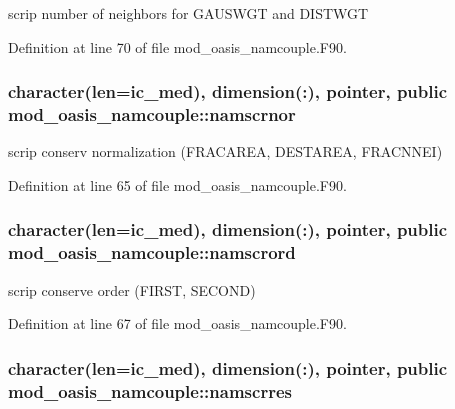 scrip number of neighbors for G\+A\+U\+S\+W\+G\+T and D\+I\+S\+T\+W\+G\+T 



Definition at line 70 of file mod\+\_\+oasis\+\_\+namcouple.\+F90.

\hypertarget{classmod__oasis__namcouple_a392f40531007d5dcc084e6ad4a393fd7}{
\subsubsection[{namscrnor}]{\setlength{\rightskip}{0pt plus 5cm}character(len=ic\+\_\+med), dimension(\+:), pointer, public mod\+\_\+oasis\+\_\+namcouple\+::namscrnor}}\label{classmod__oasis__namcouple_a392f40531007d5dcc084e6ad4a393fd7}


scrip conserv normalization (F\+R\+A\+C\+A\+R\+E\+A, D\+E\+S\+T\+A\+R\+E\+A, F\+R\+A\+C\+N\+N\+E\+I) 



Definition at line 65 of file mod\+\_\+oasis\+\_\+namcouple.\+F90.

\hypertarget{classmod__oasis__namcouple_ac881ced105604879ada860fabd677481}{
\subsubsection[{namscrord}]{\setlength{\rightskip}{0pt plus 5cm}character(len=ic\+\_\+med), dimension(\+:), pointer, public mod\+\_\+oasis\+\_\+namcouple\+::namscrord}}\label{classmod__oasis__namcouple_ac881ced105604879ada860fabd677481}


scrip conserve order (F\+I\+R\+S\+T, S\+E\+C\+O\+N\+D) 



Definition at line 67 of file mod\+\_\+oasis\+\_\+namcouple.\+F90.

\hypertarget{classmod__oasis__namcouple_a6a95ddbbbc615e0257d93d05e4546239}{
\subsubsection[{namscrres}]{\setlength{\rightskip}{0pt plus 5cm}character(len=ic\+\_\+med), dimension(\+:), pointer, public mod\+\_\+oasis\+\_\+namcouple\+::namscrres}}\label{classmod__oasis__namcouple_a6a95ddbbbc615e0257d93d05e4546239}


